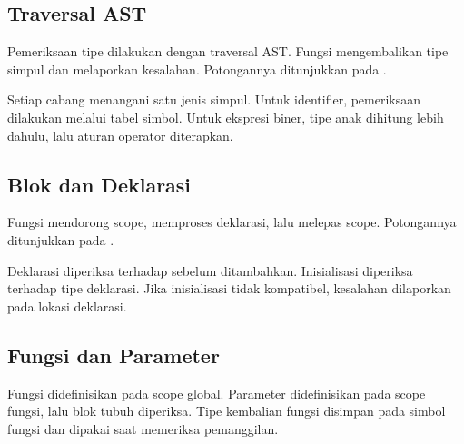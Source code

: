\subsection{Traversal AST}

Pemeriksaan tipe dilakukan dengan traversal AST. Fungsi
 mengembalikan tipe simpul dan melaporkan
kesalahan. Potongannya ditunjukkan pada .


Setiap cabang menangani satu jenis simpul. Untuk identifier,
pemeriksaan dilakukan melalui tabel simbol. Untuk ekspresi biner,
tipe anak dihitung lebih dahulu, lalu aturan operator diterapkan.

\subsection{Blok dan Deklarasi}

Fungsi  mendorong scope, memproses deklarasi,
lalu melepas scope. Potongannya ditunjukkan pada
.


Deklarasi diperiksa terhadap  sebelum
ditambahkan. Inisialisasi diperiksa terhadap tipe deklarasi. Jika
inisialisasi tidak kompatibel, kesalahan dilaporkan pada lokasi
deklarasi.

\subsection{Fungsi dan Parameter}

Fungsi didefinisikan pada scope global. Parameter didefinisikan pada
scope fungsi, lalu blok tubuh diperiksa. Tipe kembalian fungsi
disimpan pada simbol fungsi dan dipakai saat memeriksa pemanggilan.
